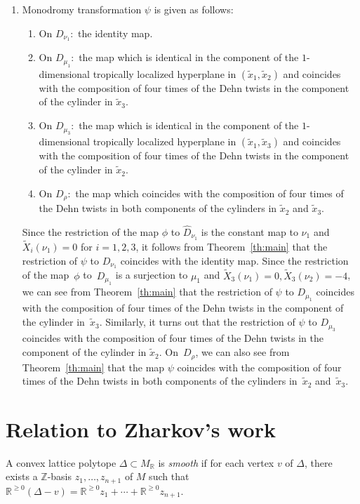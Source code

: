 \documentclass[10pt,a4paper]{amsart}
\numberwithin{equation}{section}
\begin{document}
\begin{enumerate}
\item Monodromy transformation $\psi$ is given as follows:
 \begin{enumerate}\itemsep=0pt
 \item On $D_{\nu_1} \colon$ the identity map.
 \item On $D_{\mu_1} \colon$ the map which is identical in the component of the $1$-dimensional tropically localized hyperplane in $(\tilde{x}_1, \tilde{x}_2)$ and coincides with the composition of four times of the Dehn twists in the component of the cylinder in $\tilde{x}_3$.
 \item On $D_{\mu_3} \colon$ the map which is identical in the component of the $1$-dimensional tropically localized hyperplane in $(\tilde{x}_1, \tilde{x}_3)$ and coincides with the composition of four times of the Dehn twists in the component of the cylinder in $\tilde{x}_2$.
 \item On $D_{\rho} \colon$ the map which coincides with the composition of four times of the Dehn twists in both components of the cylinders in $\tilde{x}_2$ and $\tilde{x}_3$.
 \end{enumerate}
 Since the restriction of the map $\phi$ to $\widehat{D}_{\nu_1}$ is the constant map to $\nu_1$ and $\widetilde{X}_i(\nu_1)=0$ for $i=1,2,3$, it follows from Theorem~\ref{th:main} that the restriction of $\psi$ to $D_{\nu_1}$ coincides with the identity map. Since the restriction of the map~$\phi$ to~$D_{\mu_1}$ is a surjection to $\mu_1$ and $\widetilde{X}_3(\nu_1)=0, \widetilde{X}_3(\nu_2)=-4$, we can see from Theorem~\ref{th:main} that the restriction of $\psi$ to $D_{\mu_1}$ coincides with the composition of four times of the Dehn twists in the component of the cylinder in~$\tilde{x}_3$.
 Similarly, it turns out that the restriction of $\psi$ to $D_{\mu_3}$ coincides with the composition of four times of the Dehn twists in the component of the cylinder in $\tilde{x}_2$. On~$D_\rho$, we can also see from Theorem~\ref{th:main} that the map $\psi$ coincides with the composition of four times of the Dehn twists in both components of the cylinders in~$\tilde{x}_2$ and~$\tilde{x}_3$.
\end{enumerate}

\section{Relation to Zharkov's work}\label{sc:7}

\begin{Definition}
A convex lattice polytope $\Delta \subset M_{\mathbb R}$ is {\it smooth} if for each vertex $v$ of $\Delta$, there exists a ${\mathbb Z}$-basis $z_1, \dots, z_{n+1}$ of $M$ such that ${\mathbb R}^{\geq0}(\Delta-v)={\mathbb R}^{\geq 0}z_1+ \cdots +{\mathbb R}^{\geq 0}z_{n+1}$.
\end{Definition}
\end{document}
